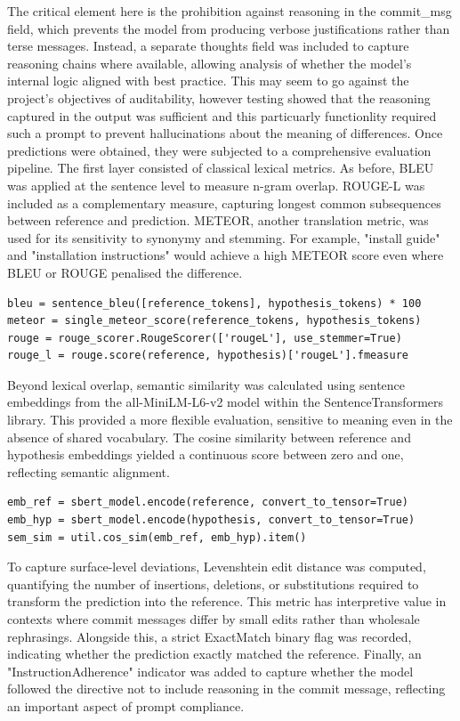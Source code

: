 \documentclass{report}
\begin{document}
The critical element here is the prohibition against reasoning in the commit\_msg field, which prevents the model from producing verbose justifications rather than terse messages. 
Instead, a separate thoughts field was included to capture reasoning chains where available, allowing analysis of whether the model's internal logic aligned with best practice.
This may seem to go against the project's objectives of auditability, however testing showed that the reasoning captured in the output was sufficient and this particuarly functionlity required such a prompt to prevent hallucinations about the meaning of differences.
Once predictions were obtained, they were subjected to a comprehensive evaluation pipeline. 
The first layer consisted of classical lexical metrics. 
As before, BLEU was applied at the sentence level to measure n-gram overlap. 
ROUGE-L was included as a complementary measure, capturing longest common subsequences between reference and prediction. 
METEOR, another translation metric, was used for its sensitivity to synonymy and stemming. 
For example, "install guide" and "installation instructions" would achieve a high METEOR score even where BLEU or ROUGE penalised the difference.

\begin{lstlisting}[style=pythonstyle]
bleu = sentence_bleu([reference_tokens], hypothesis_tokens) * 100
meteor = single_meteor_score(reference_tokens, hypothesis_tokens)
rouge = rouge_scorer.RougeScorer(['rougeL'], use_stemmer=True)
rouge_l = rouge.score(reference, hypothesis)['rougeL'].fmeasure

\end{lstlisting}

Beyond lexical overlap, semantic similarity was calculated using sentence embeddings from the all-MiniLM-L6-v2 model within the SentenceTransformers library. 
This provided a more flexible evaluation, sensitive to meaning even in the absence of shared vocabulary. 
The cosine similarity between reference and hypothesis embeddings yielded a continuous score between zero and one, reflecting semantic alignment.

\begin{lstlisting}[style=pythonstyle]
emb_ref = sbert_model.encode(reference, convert_to_tensor=True)
emb_hyp = sbert_model.encode(hypothesis, convert_to_tensor=True)
sem_sim = util.cos_sim(emb_ref, emb_hyp).item()

\end{lstlisting}

To capture surface-level deviations, Levenshtein edit distance was computed, quantifying the number of insertions, deletions, or substitutions required to transform the prediction into the reference. 
This metric has interpretive value in contexts where commit messages differ by small edits rather than wholesale rephrasings. 
Alongside this, a strict ExactMatch binary flag was recorded, indicating whether the prediction exactly matched the reference. 
Finally, an "InstructionAdherence" indicator was added to capture whether the model followed the directive not to include reasoning in the commit message, reflecting an important aspect of prompt compliance.
\end{document}
